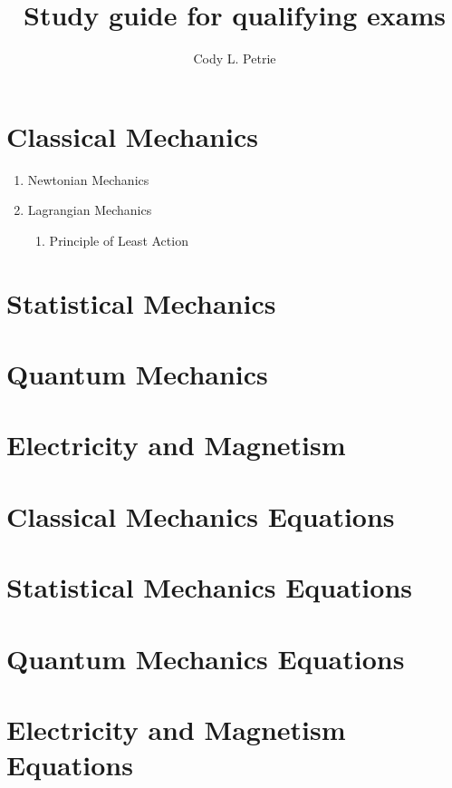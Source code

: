\documentclass[12pt]{extarticle}
\title{Study guide for qualifying exams}
\author{Cody L. Petrie}
\begin{document}
\maketitle

\section{Classical Mechanics}
\begin{enumerate}
  \item{Newtonian Mechanics}
  \begin{enumerate}
    \item{Newton's Laws/Kinematics}
    \item{Energy}
    \item{Momentum/Angular Momentum
  \end{enumerate}

  \item{Lagrangian Mechanics}
  \begin{enumerate}
    \item{Principle of Least Action}
  \end{enumerate}

\end{enumerate}

\section{Statistical Mechanics}

\section{Quantum Mechanics}

\section{Electricity and Magnetism}

\section{Classical Mechanics Equations}

\section{Statistical Mechanics Equations}

\section{Quantum Mechanics Equations}

\section{Electricity and Magnetism Equations}
\end{document}
